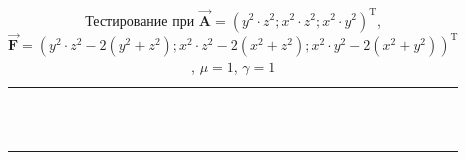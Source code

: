 \begin{table}
\caption{Тестирование при $\overrightarrow{\textbf{A}} = (y^2 \cdot z^2; x^2 \cdot z^2; x^2 \cdot y^2)^{\text{T}}$, $\overrightarrow{\textbf{F}} = (y^2 \cdot z^2 - 2(y^2 + z^2); x^2 \cdot z^2 - 2(x^2 + z^2); x^2 \cdot y^2 - 2(x^2 + y^2))^{\text{T}}$, $\mu = 1$, $\gamma = 1$}
\centering
\small
\begin{tabularx}{1.0\textwidth}{| >{\raggedright\arraybackslash}X | >{\raggedright\arraybackslash}X | >{\raggedright\arraybackslash}X |>{\raggedright\arraybackslash}X |}
	\hline
	\centering{Ребро} & \centering{Значение} & \centering{Абсолютная погрешность} & \centering{Относительная погрешность} \tabularnewline \hline


\centering{($x; 1.0; 1.0$)} & \centering{1.00000000E+000}& \centering{0.00000000E+000} & \centering{0.00000000E+000} \tabularnewline \hline

\centering{($x; 2.0; 1.0$)} & \centering{4.00000000E+000}& \centering{0.00000000E+000} & \centering{0.00000000E+000} \tabularnewline \hline

\centering{($x; 1.0; 2.0$)} & \centering{4.00000000E+000}& \centering{0.00000000E+000} & \centering{0.00000000E+000} \tabularnewline \hline

\centering{($x; 2.0; 2.0$)} & \centering{1.60000000E+001}& \centering{0.00000000E+000} & \centering{0.00000000E+000} \tabularnewline \hline



\centering{($1.0; y; 1.0$)} & \centering{1.00000000E+000}& \centering{0.00000000E+000} & \centering{0.00000000E+000} \tabularnewline \hline

\centering{($2.0; y; 1.0$)} & \centering{4.00000000E+000}& \centering{0.00000000E+000} & \centering{0.00000000E+000} \tabularnewline \hline

\centering{($1.0; y; 2.0$)} & \centering{4.00000000E+000}& \centering{0.00000000E+000} & \centering{0.00000000E+000} \tabularnewline \hline

\centering{($2.0; y; 2.0$)} & \centering{1.60000000E+001}& \centering{0.00000000E+000} & \centering{0.00000000E+000} \tabularnewline \hline



\centering{($1.0; 1.0; z$)} & \centering{1.00000000E+000}& \centering{0.00000000E+000} & \centering{0.00000000E+000} \tabularnewline \hline

\centering{($2.0; 1.0; z$)} & \centering{4.00000000E+000}& \centering{0.00000000E+000} & \centering{0.00000000E+000} \tabularnewline \hline

\centering{($1.0; 2.0; z$)} & \centering{4.00000000E+000}& \centering{0.00000000E+000} & \centering{0.00000000E+000} \tabularnewline \hline

\centering{($2.0; 2.0; z$)} & \centering{1.60000000E+001}& \centering{0.00000000E+000} & \centering{0.00000000E+000} \tabularnewline \hline
	
\end{tabularx}
\label{tab:test9}
\end{table}

